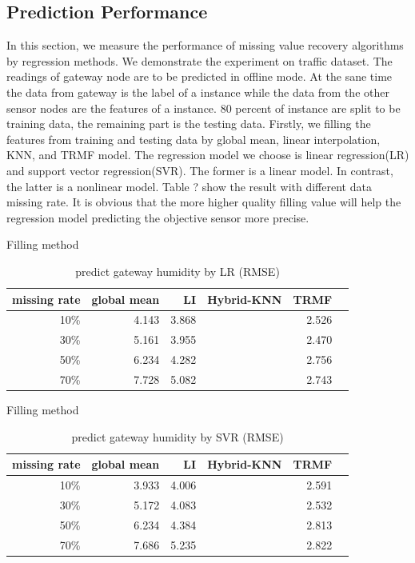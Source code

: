 \subsection{Prediction Performance}
In this section, we measure the performance of missing value recovery algorithms by regression methods.
We demonstrate the experiment on traffic dataset.
The readings of gateway node are to be predicted in offline mode.
At the sane time the data from gateway is the label of a instance while the data from the other sensor nodes are the features of a instance.
80 percent of instance are split to be training data, the remaining part is the testing data.
Firstly, we filling the features from training and testing data by global mean, linear interpolation, KNN, and TRMF model.
The regression model we choose is linear regression(LR) and support vector regression(SVR).
The former is a linear model.
In contrast, the latter is a nonlinear model.
Table ? show the result with different data missing rate.
It is obvious that the more higher quality filling value will help the regression model predicting the objective sensor more precise.

\begin{table} [htbp]
\centering
\caption{predict gateway humidity by LR (RMSE) }
\label{table: LR}
   Filling method
\begin{tabular}{ r | r r r r r}
        missing rate&global mean     &LI   &Hybrid-KNN &TRMF\\ \hline
        10\%    &4.143&3.868&&2.526\\
        30\%    &5.161&3.955&&2.470\\
        50\%    &6.234&4.282&&2.756\\
        70\%   &7.728&5.082&&2.743
\end{tabular}
\end{table}

\begin{table}[htbp]
\centering
\caption{predict gateway humidity by SVR (RMSE) }
\label{table: SVR}
   Filling method
\begin{tabular}{ r | r r r r r}
        missing rate&global mean     &LI   &Hybrid-KNN &TRMF\\ \hline
        10\%    &3.933 &4.006&&2.591\\
        30\%    &5.172&4.083&&2.532\\
        50\%    &6.234&4.384&&2.813\\
        70\%   &7.686&5.235&&2.822
\end{tabular}
\end{table}
